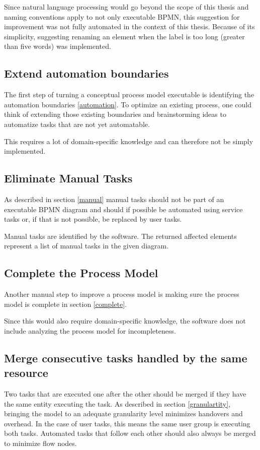 Since natural language processing would go beyond the scope of this thesis and naming conventions apply to not only executable BPMN, this suggestion for improvement was not fully automated in the context of this thesis. Because of its simplicity, suggesting renaming an element when the label is too long (greater than five words) was implemented.

\subsection{Extend automation boundaries}
The first step of turning a conceptual process model executable is identifying the automation boundaries \ref{automation}. To optimize an existing process, one could think of extending those existing boundaries and brainstorming ideas to automatize tasks that are not yet automatable. 

This requires a lot of domain-specific knowledge and can therefore not be simply implemented.

\subsection{Eliminate Manual Tasks}\label{soft-manual}
As described in section \ref{manual} manual tasks should not be part of an executable BPMN diagram and should if possible be automated using service tasks or, if that is not possible, be replaced by user tasks. 

Manual tasks are identified by the software. The returned affected elements represent a list of manual tasks in the given diagram.

\subsection{Complete the Process Model}
Another manual step to improve a process model is making sure the process model is complete in section \ref{complete}.

Since this would also require domain-specific knowledge, the software does not include analyzing the process model for incompleteness.

\subsection{Merge consecutive tasks handled by the same resource}\label{merge-section}
Two tasks that are executed one after the other should be merged if they have the same entity executing the task. As described in section \ref{granulartity}, bringing the model to an adequate granularity level minimizes handovers and overhead. In the case of user tasks, this means the same user group is executing both tasks. Automated tasks that follow each other should also always be merged to minimize flow nodes.


